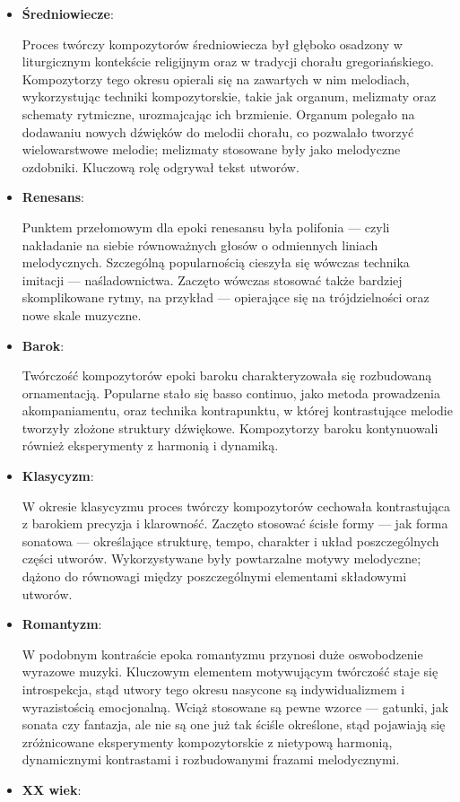 \documentclass[12pt]{article}
\begin{document}
\begin{itemize}
	\item \textbf{Średniowiecze}:
	      
	      Proces twórczy kompozytorów średniowiecza był głęboko osadzony w liturgicznym kontekście religijnym oraz w tradycji
	      chorału gregoriańskiego.
	      Kompozytorzy tego okresu opierali się na zawartych w nim melodiach, wykorzystując techniki kompozytorskie, takie jak organum,
	      melizmaty oraz schematy rytmiczne, urozmajcając ich brzmienie.
	      Organum polegało na dodawaniu nowych dźwięków do melodii chorału, co pozwalało tworzyć wielowarstwowe melodie;
	      melizmaty stosowane były jako melodyczne ozdobniki. Kluczową rolę odgrywał tekst utworów.
	\item \textbf{Renesans}:
	      
	      Punktem przełomowym dla epoki renesansu była polifonia — czyli nakładanie na siebie równoważnych głosów o odmiennych
	      liniach melodycznych.
	      Szczególną popularnością cieszyła się wówczas technika imitacji — naśladownictwa.
	      Zaczęto wówczas stosować także bardziej skomplikowane rytmy, na przykład — opierające się na trójdzielności
	      oraz nowe skale muzyczne.
	\item \textbf{Barok}:
	      
	      Twórczość kompozytorów epoki baroku charakteryzowała się rozbudowaną ornamentacją.
	      Popularne stało się basso continuo, jako metoda prowadzenia akompaniamentu, oraz technika kontrapunktu,
	      w której kontrastujące melodie tworzyły złożone struktury dźwiękowe.
	      Kompozytorzy baroku kontynuowali również eksperymenty z harmonią i dynamiką.
	\item \textbf{Klasycyzm}:
	      
	      W okresie klasycyzmu proces twórczy kompozytorów cechowała kontrastująca z barokiem precyzja i klarowność.
	      Zaczęto stosować ścisłe formy — jak forma sonatowa — określające strukturę, tempo,
	      charakter i układ poszczególnych części utworów.
	      Wykorzystywane były powtarzalne motywy melodyczne; dążono do równowagi między poszczególnymi elementami składowymi utworów.
	\item \textbf{Romantyzm}:
	      
	      W podobnym kontraście epoka romantyzmu przynosi duże oswobodzenie wyrazowe muzyki.
	      Kluczowym elementem motywującym twórczość staje się introspekcja, stąd utwory tego okresu nasycone są indywidualizmem
	      i wyrazistością emocjonalną.
	      Wciąż stosowane są pewne wzorce — gatunki, jak sonata czy fantazja, ale nie są one już tak ściśle określone,
	      stąd pojawiają się zróżnicowane eksperymenty kompozytorskie z nietypową harmonią, dynamicznymi kontrastami i rozbudowanymi
	      frazami melodycznymi.
	\item \textbf{XX wiek}:
	      

\end{itemize}
\end{document}
